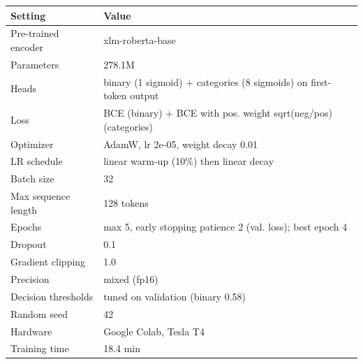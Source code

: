 \begin{tabular}{ll}
\toprule
Setting & Value \\
\midrule
Pre-trained encoder & xlm-roberta-base \\
Parameters & 278.1M \\
Heads & binary (1 sigmoid) + categories (8 sigmoids) on first-token output \\
Loss & BCE (binary) + BCE with pos. weight sqrt(neg/pos) (categories) \\
Optimizer & AdamW, lr 2e-05, weight decay 0.01 \\
LR schedule & linear warm-up (10\%) then linear decay \\
Batch size & 32 \\
Max sequence length & 128 tokens \\
Epochs & max 5, early stopping patience 2 (val. loss); best epoch 4 \\
Dropout & 0.1 \\
Gradient clipping & 1.0 \\
Precision & mixed (fp16) \\
Decision thresholds & tuned on validation (binary 0.58) \\
Random seed & 42 \\
Hardware & Google Colab, Tesla T4 \\
Training time & 18.4 min \\
\bottomrule
\end{tabular}
